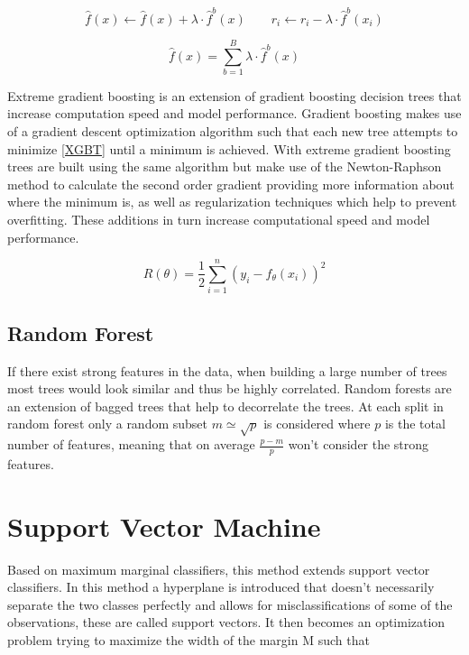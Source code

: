 \documentclass[12pt]{report}
\begin{document}
\begin{equation} \label{boost1}
    \hat{f}(x) \leftarrow \hat{f}(x) + \lambda \cdot \hat{f}^{b}(x) \phantom{0000}
    r_{i} \leftarrow r_{i} - \lambda \cdot \hat{f}^{b}(x_{i})
\end{equation}

\begin{equation} \label{boost2}
    \hat{f}(x) = \sum^{B}_{b=1} \lambda \cdot \hat{f}^{b}(x) 
\end{equation}

Extreme gradient boosting is an extension of gradient boosting decision trees that increase computation speed and model performance. Gradient boosting makes use of a gradient descent optimization algorithm such that each new tree attempts to minimize \eqref{XGBT} until a minimum is achieved. With extreme gradient boosting trees are built using the same algorithm but make use of the Newton-Raphson method to calculate the second order gradient providing more information about where the minimum is, as well as regularization techniques which help to prevent overfitting. These additions in turn increase computational speed and model performance. 

\begin{equation} \label{XGBT}
    R(\theta) = \frac{1}{2}\sum^{n}_{i=1} (y_{i} - {f}_{\theta}(x_{i}))^{2} 
\end{equation}

\subsection{Random Forest}
If there exist strong features in the data, when building a large number of trees most trees would look similar and thus be highly correlated. Random forests are an extension of bagged trees that help to decorrelate the trees. At each split in random forest only a random subset $m \simeq \sqrt{p}$ is considered where $p$ is the total number of features, meaning that on average $\frac{p-m}{p}$ won't consider the strong features.

\section{Support Vector Machine}
Based on maximum marginal classifiers, this method extends support vector classifiers. In this method a hyperplane is introduced that doesn't necessarily separate the two classes perfectly and allows for misclassifications of some of the observations, these are called support vectors. It then becomes an optimization problem trying to maximize the width of the margin M such that
\end{document}
